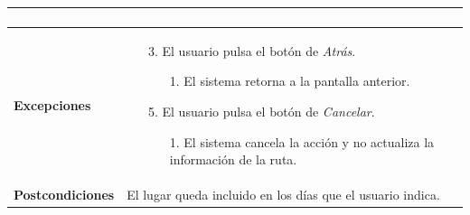 \begin{longtable}{| p{4cm} | p{10cm} |}
\begin{enumerate}[leftmargin=0.7cm, topsep=0.1cm]
\end{enumerate}


\\
\hline
\textbf{Excepciones} &\mbox{}\par\vspace{-\baselineskip}
\begin{enumerate}[leftmargin=0.9cm, topsep=0.1cm]
\item[3.] El usuario pulsa el botón de \textit{Atrás}.
	\begin{itemize}
	\item[1.] El sistema retorna a la pantalla anterior.
	\end{itemize}
\item[5.] El usuario pulsa el botón de \textit{Cancelar}.
	\begin{itemize}
	\item[1.] El sistema cancela la acción y no actualiza la información de la ruta.
	\end{itemize}
\end{enumerate}
\\

\hline
\textbf{Postcondiciones} & 
El lugar queda incluido en los días que el usuario indica.\\
\hline
\end{longtable}



\newpage
